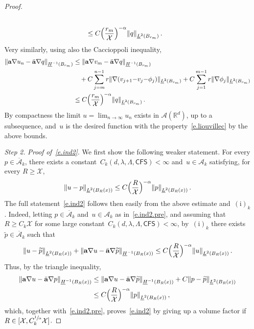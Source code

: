 \documentclass[11pt]{article} %
\numberwithin{equation}{section}
\theoremstyle{definition}
\let\originalleft\left
\let\originalright\right
\renewcommand{\left}{\mathopen{}\mathclose\bgroup\originalleft}
\renewcommand{\right}{\aftergroup\egroup\originalright}
\newcommand*{\R}{\ensuremath{\mathbb{R}}}
\renewcommand*{\tilde}{\widetilde}
\renewcommand{\a}{\mathbf{a}}
\newcommand{\ahom}{\bar{\a}}
\newcommand{\X}{\mathcal{X}}
\newcommand{\CFS}{\mathsf{CFS}}
\newcommand{\A}{\mathcal{A}}
\begin{document}
\begin{proof}
\begin{align*}
\\&
\leq C \Bigl( \frac{r_m}{\X} \Bigr)^{-\alpha}   \left\| q \right\|_{\underline{L}^2(B_{r_m})}
\,.
\end{align*}
Very similarly, using also the Caccioppoli inequality, 
\begin{align*}  
\left\|  \a \nabla u_n - \ahom \nabla q \right\|_{\underline{H}^{-1}(B_{r_m})} 
& \leq
\left\|  \a \nabla v_m - \ahom \nabla q \right\|_{\underline{H}^{-1}(B_{r_m})} 
\\ \notag 
 & \quad + C \sum_{j=m}^{n-1}  r \| \nabla (v_{j+1} {-} v_j {-} \phi_j) \|_{\underline{L}^2(B_{r_m})}
+ C \sum_{j=1}^{m-1 } r \| \nabla \phi_j \|_{\underline{L}^2(B_{r_m})}
\\&
\leq C \Bigl( \frac{r_m}{\X} \Bigr)^{-\alpha}   \left\| q \right\|_{\underline{L}^2(B_{r_m})}
\,.
\end{align*}
By compactness the limit $u = \lim_{n \to \infty} u_n$ exists  in $\mathcal{A}(\R^d)$, up to a subsequence,  and~$u$ is the desired function with the property~\eqref{e.liouvillec} by the above bounds. 

\smallskip

\emph{Step 2. Proof of~\eqref{e.ind2}.} We first show the following weaker statement. For every $p\in \overline{\A}_k$, there exists a constant~$C_k(d,\lambda,\Lambda,\CFS)<\infty$ and~$u\in \A_k$ satisfying, for every $R\geq \X$,
\begin{align}  \label{e.ind2.pre}
\left\| u - p \right\|_{\underline{L}^2(B_R(x))} 
\leq 
C \Bigl( \frac{R}{\X} \Bigr)^{-\alpha}
\left\| p \right\|_{\underline{L}^2(B_R(x))} \,.
\end{align}
The full statement~\eqref{e.ind2} follows then easily from the above estimate and~$\mathrm{(i)}_k$. Indeed, letting $p \in \overline{\A}_k$ and~$u\in \A_k$ as in~\eqref{e.ind2.pre}, and assuming that~$R \geq C_k \X$ for some large constant~$C_k(d,\lambda,\Lambda,\CFS)<\infty$, by~$\mathrm{(i)}_k$ there exists~$\tilde p \in  \overline{\A}_k$ such that
\begin{align*}  
\left\| u - \tilde p \right\|_{\underline{L}^2(B_R(x))} 
+
\left\|  \a \nabla u - \ahom \nabla \tilde p \right\|_{\underline{H}^{-1}(B_R(x))} 
\leq
C \Bigl( \frac{R}{\X} \Bigr)^{-\alpha}
\left\| u \right\|_{\underline{L}^2(B_R(x))} 
\,.
\end{align*}
Thus, by the triangle inequality,
\begin{align*}  
\left\|  \a \nabla u - \ahom \nabla p \right\|_{\underline{H}^{-1}(B_R(x))} 
& 
\leq
\left\|  \a \nabla u - \ahom \nabla \tilde p \right\|_{\underline{H}^{-1}(B_R(x))} + C \left\| p - \tilde p \right\|_{\underline{L}^2(B_R(x))} 
\\ & 
\leq
C \Bigl( \frac{R}{\X} \Bigr)^{-\alpha}
\left\| p \right\|_{\underline{L}^2(B_R(x))} 
 \,,
\end{align*}
which, together with~\eqref{e.ind2.pre}, proves~\eqref{e.ind2} by giving up a volume factor if $R \in [\X,C_k^{\sfrac1\alpha}\X]$. 


\end{proof}
\end{document}
